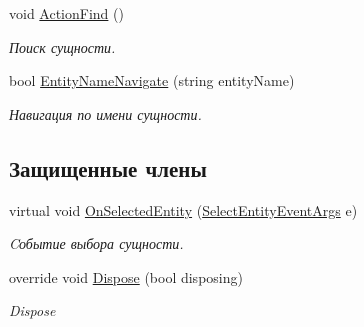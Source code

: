 \begin{DoxyCompactItemize}
void \mbox{\hyperlink{class_f_b_a_1_1_comp_entity_tree_f_b_a_ac69095926584fc1645837add5381b8b5}{Action\+Find}} ()
\begin{DoxyCompactList}\small\item\em Поиск сущности. \end{DoxyCompactList}\item 
bool \mbox{\hyperlink{class_f_b_a_1_1_comp_entity_tree_f_b_a_a00d71dd4b35dac8882641ce914ad92ed}{Entity\+Name\+Navigate}} (string entity\+Name)
\begin{DoxyCompactList}\small\item\em Навигация по имени сущности. \end{DoxyCompactList}\end{DoxyCompactItemize}
\subsection*{Защищенные члены}
\begin{DoxyCompactItemize}
\item 
virtual void \mbox{\hyperlink{class_f_b_a_1_1_comp_entity_tree_f_b_a_a2332931cd4bf90d64028c90bd21c028a}{On\+Selected\+Entity}} (\mbox{\hyperlink{class_f_b_a_1_1_select_entity_event_args}{Select\+Entity\+Event\+Args}} e)
\begin{DoxyCompactList}\small\item\em Cобытие выбора сущности. \end{DoxyCompactList}\item 
override void \mbox{\hyperlink{class_f_b_a_1_1_comp_entity_tree_f_b_a_a682acd15f071cb748546c0a86c185c48}{Dispose}} (bool disposing)
\begin{DoxyCompactList}\small\item\em Dispose \end{DoxyCompactList}\end{DoxyCompactItemize}
